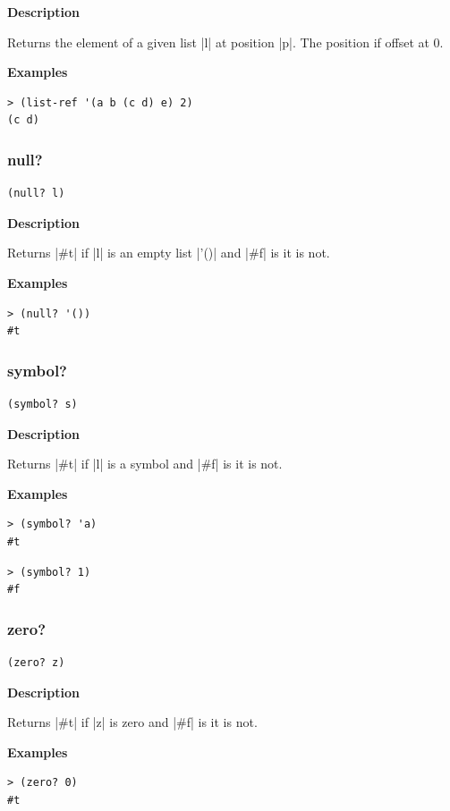 \documentclass[a4paper]{article}
\begin{document}
\textbf{Description}

Returns the element of a given list |l| at position |p|. The position if offset at 0.

\textbf{Examples}

\begin{lstlisting}
> (list-ref '(a b (c d) e) 2)
(c d)
\end{lstlisting}

\subsubsection{null?}

\begin{lstlisting}[frame=none]
(null? l)
\end{lstlisting}

\textbf{Description}

Returns |#t| if |l| is an empty list |'()| and |#f| is it is not.

\textbf{Examples}

\begin{lstlisting}
> (null? '())
#t
\end{lstlisting}

\subsubsection{symbol?}

\begin{lstlisting}[frame=none]
(symbol? s)
\end{lstlisting}

\textbf{Description}

Returns |#t| if |l| is a symbol and |#f| is it is not.

\textbf{Examples}

\begin{lstlisting}
> (symbol? 'a)
#t
\end{lstlisting}

\begin{lstlisting}
> (symbol? 1)
#f
\end{lstlisting}

\subsubsection{zero?}

\begin{lstlisting}[frame=none]
(zero? z)
\end{lstlisting}

\textbf{Description}

Returns |#t| if |z| is zero and |#f| is it is not.

\textbf{Examples}

\begin{lstlisting}
> (zero? 0)
#t
\end{lstlisting}
\end{document}

